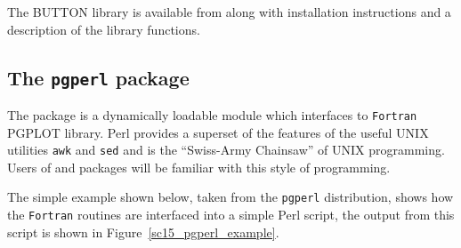 \documentclass[twoside,11pt]{starlink}
\begin{document}
The BUTTON library is available from  along with
installation instructions and a description of the library functions.

\subsection{The \texttt{pgperl} package\label{sc15_pgperl}}

The  package is a
dynamically loadable 
module which interfaces to \texttt{Fortran} PGPLOT library. Perl provides
a superset of the features of the useful UNIX utilities \texttt{awk}
and \texttt{sed} and is the ``Swiss-Army Chainsaw'' of UNIX
programming. Users of  and
 packages will be familiar with this style of
programming.

The simple example shown below, taken from the \texttt{pgperl}
distribution, shows how the \texttt{Fortran} routines are interfaced into
a simple Perl script, the output from this script is shown in
Figure~\ref{sc15_pgperl_example}.
\end{document}
